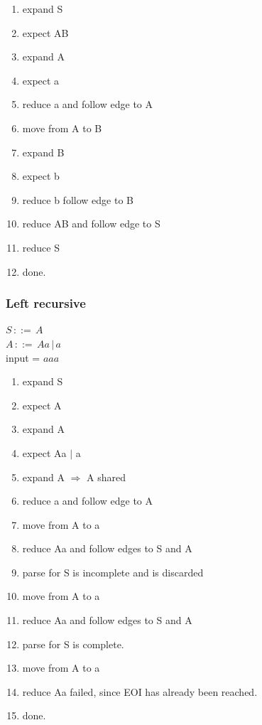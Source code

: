\documentclass[a4paper,10pt]{article}
\begin{document}
\begin{enumerate}
 \setlength{\itemsep}{0pt}
 \setlength{\parskip}{0pt}
 \setlength{\parsep}{0pt}
 
 \item expand S
 \item expect AB
 \item expand A
 \item expect a
 \item reduce a and follow edge to A
 \item move from A to B
 \item expand B
 \item expect b
 \item reduce b follow edge to B
 \item reduce AB and follow edge to S
 \item reduce S
 \item done.
\end{enumerate}

\subsubsection{Left recursive}
$S\,::=\,A$\\
$A\,::=\,Aa\,|\,a$\\
input = $aaa$

\begin{enumerate}
 \setlength{\itemsep}{0pt}
 \setlength{\parskip}{0pt}
 \setlength{\parsep}{0pt}
 
 \item expand S
 \item expect A
 \item expand A
 \item expect Aa $|$ a
 \item expand A $\Rightarrow$ A shared
 \item reduce a and follow edge to A
 \item move from A to a
 \item reduce Aa and follow edges to S and A
 \item parse for S is incomplete and is discarded
 \item move from A to a
 \item reduce Aa and follow edges to S and A
 \item parse for S is complete.
 \item move from A to a
 \item reduce Aa failed, since EOI has already been reached.
 \item done.
\end{enumerate}
\end{document}
